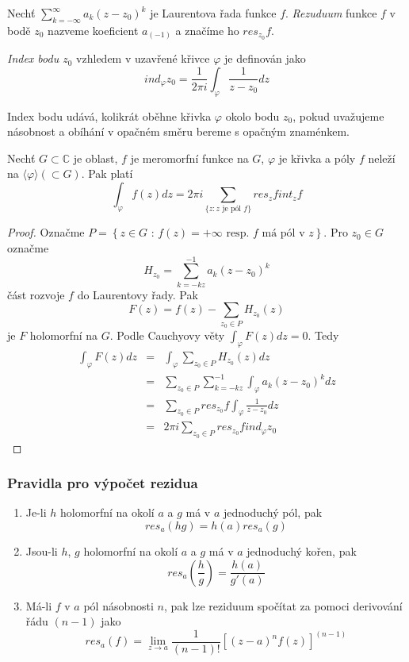 \begin{definice}
Nechť $\sum_{k =- \infty}^\infty a_k ( z-z_0)^k$ je Laurentova řada funkce $f$. \emph{Rezuduum} funkce $f$ v bodě $z_0$ nazveme koeficient $a_{(-1)}$ a značíme ho $res_{z_0} f$.
\end{definice}

\begin{definice}
\emph{Index bodu $z_0$} vzhledem v uzavřené křivce $\varphi$ je definován jako
$$ind_\varphi z_0 = \frac{1}{2 \pi i} \int_\varphi \frac{1}{z-z_0}dz$$
\end{definice}

Index bodu udává, kolikrát oběhne křivka $\varphi$ okolo bodu $z_0$, pokud uvažujeme násobnost a obíhání v opačném směru bereme s opačným znaménkem.

\begin{vetat}
Nechť $G \subset \mathbb{C}$ je oblast, $f$ je meromorfní funkce na $G$, $\varphi$ je křivka a póly $f$ neleží na $\langle \varphi \rangle (\subset G)$. Pak platí
$$\int_\varphi f(z) dz = 2 \pi i \sum_{\{z: z \textrm{ je pól } f\}} res_z f int_z f$$
\end{vetat}

\begin{proof}
Označme $P = \left\{ z \in G \textrm{ : } f(z)=+\infty \textrm{ resp. $f$ má pól v $z$} \right\}$. 
Pro $z_0 \in G$ označme 
$$H_{z_0} = \sum_{k = -kz}^{-1} a_k (z-z_0)^k$$ 
část rozvoje $f$ do Laurentovy řady.
Pak $$F(z) = f(z) - \sum_{z_0 \in P} H_{z_0}(z)$$ je $F$ holomorfní na $G$.
Podle Cauchyovy věty $\int_\varphi F(z) dz = 0$. Tedy
\begin{eqnarray}
\int_\varphi F(z) dz & = & \int_\varphi \sum_{z_0 \in P} H_{z_0}(z) dz \nonumber\\
& = & \sum_{z_0 \in P} \sum_{k=-kz}^{-1} \int_\varphi a_k (z-z_0)^k dz \nonumber\\
& = & \sum_{z_0 \in P} res_{z_0} f \int_\varphi \frac{1}{z-z_0} dz \nonumber\\
& = & 2 \pi i \sum_{z_0 \in P} res_{z_0} f ind_\varphi z_0 \nonumber
\end{eqnarray}
\end{proof}

\subsubsection*{Pravidla pro výpočet rezidua}

\begin{enumerate}
\item Je-li $h$ holomorfní na okolí $a$ a $g$ má v $a$ jednoduchý pól, pak
$$res_a(hg) = h(a) res_a (g)$$
\item Jsou-li $h$, $g$ holomorfní na okolí $a$ a $g$ má v $a$ jednoduchý kořen, pak 
$$res_a \left( \frac{h}{g} \right) = \frac{h(a)}{g \prime (a)}$$
\item Má-li $f$ v $a$ pól násobnosti $n$, pak lze reziduum spočítat za pomoci derivování řádu $(n-1)$ jako
$$res_a(f) = \lim_{z \rightarrow a} \frac{1}{(n-1)!} \left[ (z-a)^n f(z) \right]^{(n-1)}$$
\end{enumerate}

